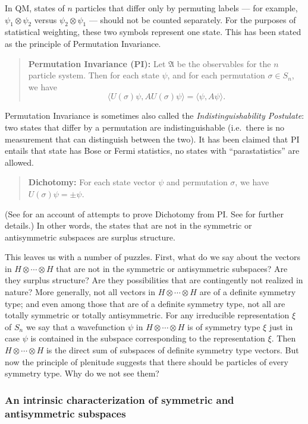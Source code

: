 \documentclass[11pt]{article}
\theoremstyle{definition}
\theoremstyle{definition}
\theoremstyle{remark}
\def\al#1{{\mathfrak #1}}
\begin{document}
In QM, states of $n$ particles that differ only by permuting labels
--- for example, $\psi _1\otimes \psi _2$ versus $\psi _2\otimes \psi
_1$ --- should not be counted separately.  For the purposes of
statistical weighting, these two symbols represent one state.  This
has been stated as the principle of Permutation Invariance.
\begin{quote}
  \textbf{Permutation Invariance (PI):} Let $\al A$ be the observables
  for the $n$ particle system.  Then for each state $\psi$, and for
  each permutation $\sigma \in S_n$, we have
$$ \langle U(\sigma)\psi ,AU(\sigma )\psi \rangle = \langle \psi
,A\psi \rangle .$$ 
\end{quote}
Permutation Invariance is sometimes also called the
\emph{Indistinguishability Postulate}: two states that differ by a
permutation are indistinguishable (i.e.\ there is no measurement that
can distinguish between the two).  It has been claimed that PI entails
that state has Bose or Fermi statistics, no states with
``parastatistics'' are allowed.
\begin{quote}
  \textbf{Dichotomy:} For each state vector $\psi$ and permutation
  $\sigma$, we have $U(\sigma )\psi =\pm \psi$.
\end{quote}
(See \cite[pp.\ 389ff]{bas} for an account of attempts to prove
Dichotomy from PI.  See \cite{jb} for further details.)  In other
words, the states that are not in the symmetric or antisymmetric
subspaces are surplus structure.

This leaves us with a number of puzzles.  First, what do we say about
the vectors in $H\otimes \cdots \otimes H$ that are not in the
symmetric or antisymmetric subspaces?  Are they surplus structure?
Are they possibilities that are contingently not realized in nature?
More generally, not all vectors in $H\otimes \cdots \otimes H$ are of
a definite symmetry type; and even among those that are of a definite
symmetry type, not all are totally symmetric or totally antisymmetric.
For any irreducible representation $\xi$ of $S_n$ we say that a
wavefunction $\psi$ in $H\otimes \cdots \otimes H$ is of symmetry type
$\xi$ just in case $\psi$ is contained in the subspace corresponding
to the representation $\xi$.  Then $H\otimes \cdots \otimes H$ is the
direct sum of subspaces of definite symmetry type vectors. But now the
principle of plenitude suggests that there should be particles of
every symmetry type.  Why do we not see them?


\subsubsection{An intrinsic characterization of symmetric and
  antisymmetric subspaces}
\end{document}
